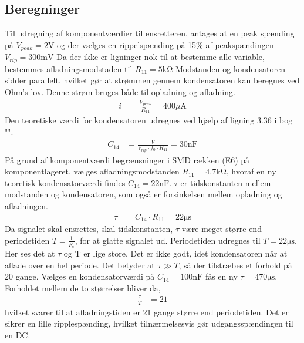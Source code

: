 \subsection{Beregninger}
Til udregning af komponentværdier til ensretteren, antages at en peak spænding på $V_{peak} = 2\si{\volt}$ og der vælges en rippelspænding på 15\% af peakspændingen $V_{rip} = 300 \si{\milli\volt}$
Da der ikke er ligninger nok til at bestemme alle variable, bestemmes afladningsmodstaden til $R_{11} = 5 \si{\kilo\ohm}$
Modstanden og kondensatoren sidder parallelt, hvilket gør at strømmen gennem kondensatoren kan beregnes ved Ohm's lov. Denne strøm bruges både til opladning og afladning.
\begin{align}
	i & = \frac{V_{peak}}{R_{11}} = 400 \si{\mu\ampere}
\end{align}
Den teoretiske værdi for kondensatoren udregnes ved hjælp af ligning 3.36 i bog "\cite[side. 160]{Sedra19uu}".
\begin{align}
	C_{14} & = \frac{V}{V_{rip} \cdot f_0 \cdot R_{11}} = 30\si{\nano\farad}
\end{align}
På grund af komponentværdi begrænsninger i SMD rækken (E6) på komponentlageret, vælges afladningsmodstanden $R_{11} = 4.7 \si{\kilo\ohm}$, hvoraf en ny teoretisk kondensatorværdi findes $C_{14} = 22 \si{\nano\farad}$.
$\tau$ er tidskonstanten mellem modstanden og kondensatoren, som også er forsinkelsen mellem opladning og afladningen. 
\begin{align}
	\tau & = C_{14} \cdot R_{11} = 22\si{\micro\second}
\end{align}
Da signalet skal ensrettes, skal tidskonstanten, $\tau$ være meget større end periodetiden $T = \frac{1}{F_c}$, for at glatte signalet ud. Periodetiden udregnes til $T = 22 \si{\micro\second}$. Her ses det at $\tau$ og T er lige store. Det er ikke godt, idet kondensatoren når at aflade over en hel periode. Det betyder at $\tau \gg T$, så der tilstræbes et forhold på 20 gange.
Vælges en kondensatorværdi på $C_{14} = 100 \si{\nano\farad}$ fås en ny $\tau = 470\si{\micro\second}$. Forholdet mellem de to størrelser bliver da, 
\begin{align}
	\frac{\tau}{T} & = 21
\end{align}
hvilket svarer til at afladningstiden er 21 gange større end periodetiden. Det er sikrer en lille ripplespænding, hvilket tilnærmelsesvis gør udgangsspændingen til en DC.
